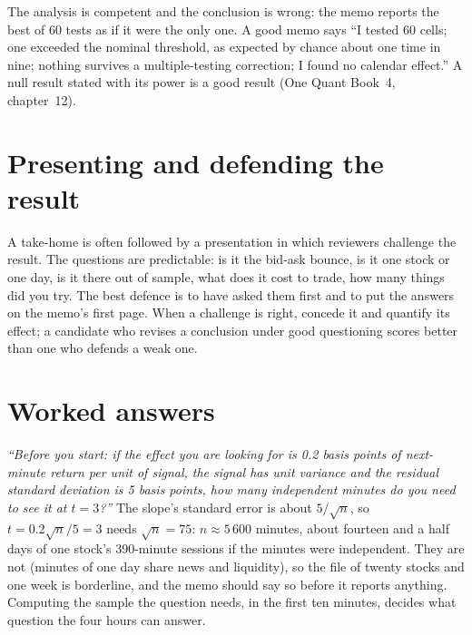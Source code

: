 \begin{remark}\label{rem:iv:research-case-studies-and-take-homes:rev2}
The analysis is competent and the conclusion is wrong: the memo reports the best of 60 tests as if it were the only one. A
good memo says ``I tested 60 cells; one exceeded the nominal threshold, as expected by chance about one time in nine; nothing
survives a multiple-testing correction; I found no calendar effect.'' A null result stated with its power is a good result
(One Quant Book~4, chapter~12).
\end{remark}

\section{Presenting and defending the result}

A take-home is often followed by a presentation in which reviewers challenge the result. The questions are predictable: is it
the bid-ask bounce, is it one stock or one day, is it there out of sample, what does it cost to trade, how many things did you
try. The best defence is to have asked them first and to put the answers on the memo's first page. When a challenge is right,
concede it and quantify its effect; a candidate who revises a conclusion under good questioning scores better than one who
defends a weak one.

\section{Worked answers}

\begin{example}\label{ex:iv:research-case-studies-and-take-homes:power}
\emph{``Before you start: if the effect you are looking for is 0.2 basis points of next-minute return per unit of signal,
the signal has unit variance and the residual standard deviation is 5 basis points, how many independent minutes do you
need to see it at $t = 3$?''} The slope's standard error is about $5/\sqrt{n}$, so $t = 0.2\sqrt n/5 = 3$ needs $\sqrt n =
75$: $n \approx 5\,600$ minutes, about fourteen and a half days of one stock's 390-minute sessions if the minutes were
independent. They are not (minutes of one day share news and liquidity), so the file of twenty stocks and one week is
borderline, and the memo should say so before it reports anything. Computing the sample the question needs, in the first ten
minutes, decides what question the four hours can answer.
\end{example}

